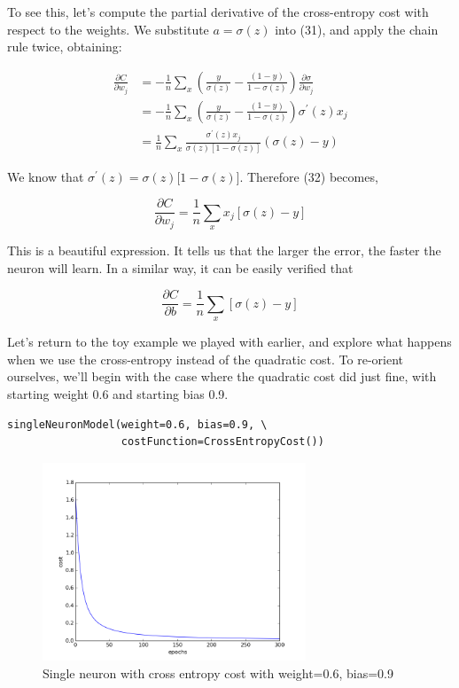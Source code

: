 \documentclass[12 pt]{article}
\begin{document}
To see this, let's compute the partial derivative of the cross-entropy
cost with respect to the weights. We substitute $ a = \sigma(z) $ into
(31), and apply the chain rule twice, obtaining:

\begin{equation}
    \begin{split}
        \frac{\partial C}{\partial w_j} & = -\frac{1}{n}\sum_x \left (
        \frac{y}{\sigma(z)} - \frac{(1 - y)}{1 - \sigma(z)} \right)
        \frac{\partial \sigma}{\partial w_j} \\
        & = -\frac{1}{n}\sum_x \left (
        \frac{y}{\sigma(z)} - \frac{(1 - y)}{1 - \sigma(z)} \right)
        \sigma^{\prime} (z) x_j \\
        & = \frac{1}{n} \sum_x  \frac{\sigma ^ \prime(z) x_j}
        {\sigma(z)[1 - \sigma(z)]}(\sigma(z) - y)
     \end{split}
\end{equation}

We know that $ \sigma^{\prime}(z) = \sigma(z){[}1 - \sigma(z){]} $.
Therefore (32) becomes,

\begin{equation}
    \frac{\partial C}{\partial w_j} = \frac{1}{n} \sum_x x_j [\sigma(z) - y]
\end{equation}

This is a beautiful expression. It tells us that the larger the error,
the faster the neuron will learn. In a similar way, it can be easily
verified that

\begin{equation}
    \frac{\partial C}{\partial b} = \frac{1}{n} \sum_x [\sigma(z) - y]
\end{equation}

Let's return to the toy example we played with earlier, and explore what
happens when we use the cross-entropy instead of the quadratic cost. To
re-orient ourselves, we'll begin with the case where the quadratic cost
did just fine, with starting weight 0.6 and starting bias 0.9.

\begin{verbatim}
singleNeuronModel(weight=0.6, bias=0.9, \
                  costFunction=CrossEntropyCost())
\end{verbatim}

\begin{figure}[htp]
\centering
\includegraphics[width=0.7\textwidth]{./figs/single_neuron2_cross_entropy_cost.png}
\caption{Single neuron with cross entropy cost with weight=0.6, bias=0.9}
\end{figure}
\end{document}
